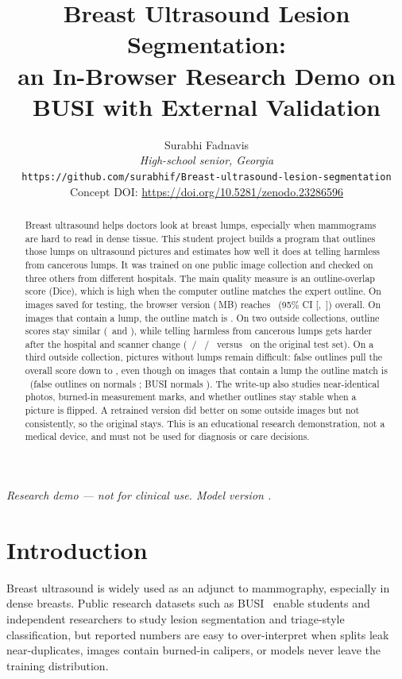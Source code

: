 \documentclass[11pt,a4paper]{article}
\title{Breast Ultrasound Lesion Segmentation:\\
an In-Browser Research Demo on BUSI with External Validation}
\author{Surabhi Fadnavis\\
\textit{High-school senior, Georgia}\\
\texttt{https://github.com/surabhif/Breast-ultrasound-lesion-segmentation}\\
Concept DOI: \url{https://doi.org/10.5281/zenodo.23286596}}
\date{}
\begin{document}
\maketitle
\begin{center}
\small\textit{Research demo --- not for clinical use. Model version \MetricModelVersion.}
\end{center}

\begin{abstract}
Breast ultrasound helps doctors look at breast lumps, especially when mammograms are hard to
read in dense tissue. This student project builds a program that outlines those lumps on
ultrasound pictures and estimates how well it does at telling harmless from cancerous lumps.
It was trained on one public image collection and checked on three others from different
hospitals. The main quality measure is an outline-overlap score (Dice), which is high when
the computer outline matches the expert outline. On images saved for testing, the browser
version (\MetricOnnxMb\,MB) reaches \MetricServedTestDice\ (95\% CI
[\MetricServedTestDiceCIlo,~\MetricServedTestDiceCIhi]) overall. On images that contain a
lump, the outline match is \MetricServedLesionDice. On two outside collections, outline
scores stay similar (\MetricBusbraDice\ and \MetricBreastDice), while telling harmless from
cancerous lumps gets harder after the hospital and scanner change (\MetricBusbraAuc\ /
\MetricBreastAuc\ / \MetricBusuclmAuc\ versus \MetricServedAuc\ on the original test set). On
a third outside collection, pictures without lumps remain difficult: false outlines pull the
overall score down to \MetricBusuclmDice, even though on images that contain a lump the
outline match is \MetricBusuclmLesionDice\ (false outlines on normals \MetricBusuclmNormalFP;
BUSI normals \MetricNormalFP). The write-up also studies near-identical photos, burned-in
measurement marks, and whether outlines stay stable when a picture is flipped. A retrained
version did better on some outside images but not consistently, so the original stays. This
is an educational research demonstration, not a medical device, and must not be used for
diagnosis or care decisions.
\end{abstract}

\section{Introduction}

Breast ultrasound is widely used as an adjunct to mammography, especially in dense breasts.
Public research datasets such as BUSI~\cite{aldhabyani2020busi} enable students and
independent researchers to study lesion segmentation and triage-style classification, but
reported numbers are easy to over-interpret when splits leak near-duplicates, images contain
burned-in calipers, or models never leave the training distribution.
\end{document}
